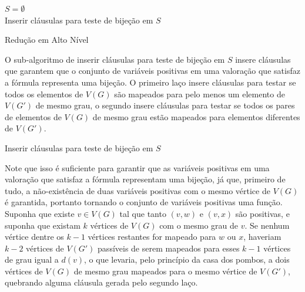\documentclass[12pt,a4paper]{article}
\begin{document}
\begin{algorithm}[H]
$S = \emptyset$ \\
Inserir cláusulas para teste de bijeção em $S$ \\
\caption{Redução em Alto Nível}
\end{algorithm}

O sub-algoritmo de inserir cláusulas para teste de bijeção em $S$ insere cláusulas que garantem que o conjunto de variáveis positivas 
em uma valoração que satisfaz a fórmula representa uma bijeção. O primeiro laço insere cláusulas para testar se todos os 
elementos de $V(G)$ são mapeados para pelo menos um elemento de $V(G')$ de mesmo grau, o segundo insere cláusulas para testar se todos 
os pares de elementos de $V(G)$ de mesmo grau estão mapeados para elementos diferentes de $V(G')$. 

\begin{algorithm}[H]



\caption{Inserir cláusulas para teste de bijeção em $S$}
\end{algorithm}

Note que isso é suficiente para garantir que as variáveis positivas em 
uma valoração que satisfaz a fórmula representam uma bijeção, já que, primeiro de tudo, a não-existência de duas variáveis positivas 
com o mesmo vértice de $V(G)$ é garantida, portanto tornando o conjunto de variáveis positivas uma função. Suponha que 
existe $v \in V(G)$ tal que tanto $(v,w)$ e $(v,x)$ são positivas, e suponha que existam $k$ vértices de $V(G)$ com o mesmo grau de 
$v$. Se nenhum vértice dentre os $k-1$ vértices restantes for mapeado para $w$ ou $x$, haveriam $k-2$ vértices de $V(G')$ passíveis de 
serem mapeados para esses $k-1$ vértices de grau igual a $d(v)$, o que levaria, pelo princípio da casa dos pombos, a dois vértices de 
$V(G)$ de mesmo grau mapeados para o mesmo vértice de $V(G')$, quebrando alguma cláusula gerada pelo segundo laço.
\end{document}
